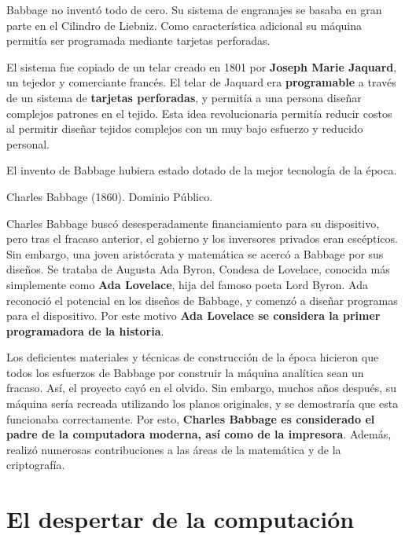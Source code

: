 \begin{knowwhat}
Babbage no inventó todo de cero. Su sistema de engranajes se basaba en gran
parte en el Cilindro de Liebniz. Como característica adicional su máquina
permitía ser programada mediante tarjetas perforadas.

 El sistema fue copiado de
un telar creado en 1801 por \textbf{Joseph Marie Jaquard}, un tejedor y
comerciante francés. El telar de Jaquard era \textbf{programable} a través de un
sistema de \textbf{tarjetas perforadas}, y permitía a una persona diseñar
complejos patrones en el tejido. Esta idea revolucionaria permitía reducir
costos al permitir diseñar tejidos complejos con un muy bajo esfuerzo y reducido
personal.

El invento de Babbage hubiera estado dotado de la mejor tecnología de la época.
\end{knowwhat}

{Charles Babbage (1860).} {Dominio Público.}

Charles Babbage buscó desesperadamente financiamiento para su dispositivo, pero
tras el fracaso anterior, el gobierno y los inversores privados eran escépticos.
Sin embargo, una joven aristócrata y matemática se acercó a Babbage por sus
diseños. Se trataba de Augusta Ada Byron, Condesa de Lovelace, conocida más
simplemente como \textbf{Ada Lovelace}, hija del famoso poeta Lord Byron. Ada
reconoció el potencial en los diseños de Babbage, y comenzó a diseñar programas
para el dispositivo. Por este motivo \textbf{Ada Lovelace se considera la primer
programadora de la historia}.\autocite{fuegi_2003}

Los deficientes materiales y técnicas de construcción de la época hicieron que
todos los esfuerzos de Babbage por construir la máquina analítica sean un
fracaso. Así, el proyecto cayó en el olvido. Sin embargo, muchos años después,
su máquina sería recreada utilizando los planos originales, y se demostraría que
esta funcionaba correctamente. Por esto, \textbf{Charles Babbage es considerado
el padre de la computadora moderna, así como de la impresora}. Además, realizó
numerosas contribuciones a las áreas de la matemática y de la criptografía.

\section{El despertar de la computación}
\label{chap:historia_computadoras:sec:despertar}

